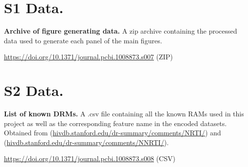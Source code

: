 \documentclass[
  11pt,
  twoside,
  BCOR=10mm,
  listof=totoc]{scrbook}
\begin{document}
\hypertarget{s1-data.}{%
\section{S1 Data.}\label{s1-data.}}

\textbf{Archive of figure generating data.} A zip archive containing the processed data used to generate each panel of the main figures.

\url{https://doi.org/10.1371/journal.pcbi.1008873.s007} (ZIP)

\hypertarget{s2-data.}{%
\section{S2 Data.}\label{s2-data.}}

\textbf{List of known DRMs.} A .csv file containing all the known RAMs used in this project as well as the corresponding feature name in the encoded datasets. Obtained from (\href{https://hivdb.stanford.edu/dr-summary/comments/NRTI/}{hivdb.stanford.edu/dr-summary/comments/NRTI/}) and (\href{https://hivdb.stanford.edu/dr-summary/comments/NNRTI/}{hivdb.stanford.edu/dr-summary/comments/NNRTI/}).

\url{https://doi.org/10.1371/journal.pcbi.1008873.s008} (CSV)

\printbibliography[segment=\therefsegment,heading=subbibintoc,title={References for Appendix \thechapter}]

\backmatter
{}

\printbibliography[title=Global References]
\end{document}
